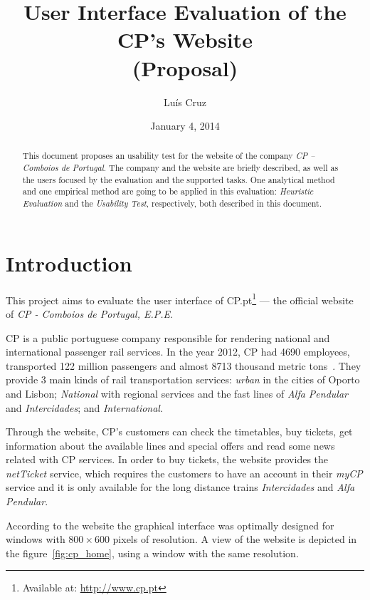 \documentclass[a4paper]{article}
\title{User Interface Evaluation of the CP's Website\\ (Proposal)}
\author[1]{Luís  Cruz}
\affil[1]{MAP-i\\ Joint Doctoral Programme in Computer Science}
\date{January 4, 2014}
\begin{document}
\maketitle

\begin{abstract}
  This document proposes an usability test for the website of the company \emph{CP -- Comboios de Portugal}. The company and the website are briefly described, as well as the users focused by the evaluation and the supported tasks. One analytical method and one empirical method are going to be applied in this evaluation: \emph{Heuristic Evaluation} and the \emph{Usability Test}, respectively, both described in this document.
\end{abstract}

\section{Introduction}

This project aims to evaluate the user interface of CP.pt\footnote{Available at: \url{http://www.cp.pt}} --- the official website of \emph{CP - Comboios de Portugal, E.P.E}.

CP is a public portuguese company responsible for rendering national and international passenger rail services. In the year 2012, CP had 4690 employees, transported 122 million passengers and almost 8713 thousand metric tons~\citep{CP2012aa}. They provide 3 main kinds of rail transportation services: \emph{urban} in the cities of Oporto and Lisbon; \emph{National} with regional services and the fast lines of \emph{Alfa Pendular} and \emph{Intercidades}; and \emph{International}.

Through the website, CP's customers can check the timetables, buy tickets, get information about the available lines and special offers and read some news related with CP services. In order to buy tickets, the website provides the \emph{netTicket} service, which requires the customers to have an account in their \emph{myCP} service and it is only available for the long distance trains \emph{Intercidades} and \emph{Alfa Pendular}.

According to the website the graphical interface was optimally designed for windows with $800\times 600$ pixels of resolution. A view of the website is depicted in the figure~\ref{fig:cp_home}, using a window with the same resolution. 
\end{document}
